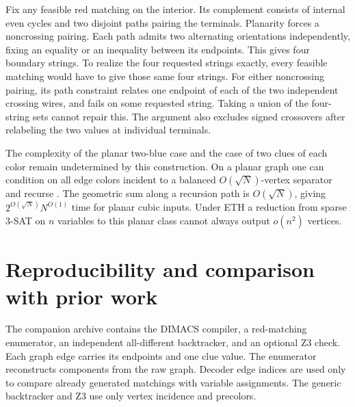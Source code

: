 \documentclass[12pt,letterpaper]{article}
\newcommand{\sh}[1]{\par\smallskip{\bfseries\color{ink}#1}\quad}
\newcommand{\Sec}[1]{\section{\color{ink}#1}}
\begin{document}
Fix any feasible red matching on the interior. Its complement consists of internal even cycles and two disjoint paths pairing the terminals. Planarity forces a noncrossing pairing. Each path admits two alternating orientations independently, fixing an equality or an inequality between its endpoints. This gives four boundary strings. To realize the four requested strings exactly, every feasible matching would have to give those same four strings. For either noncrossing pairing, its path constraint relates one endpoint of each of the two independent crossing wires, and fails on some requested string. Taking a union of the four-string sets cannot repair this. The argument also excludes signed crossovers after relabeling the two values at individual terminals.

The complexity of the planar two-blue case and the case of two clues of each color remain undetermined by this construction. On a planar graph one can condition on all edge colors incident to a balanced \(O(\sqrt{N})\)-vertex separator and recurse \cite{lt}. The geometric sum along a recursion path is \(O(\sqrt N)\), giving \(2^{O(\sqrt N)}N^{O(1)}\) time for planar cubic inputs. Under ETH a reduction from sparse 3-SAT on \(n\) variables to this planar class cannot always output \(o(n^2)\) vertices.

\newpage
\Sec{Reproducibility and comparison with prior work}
\begingroup\small
\sh{Raw graph tests.}
The companion archive contains the DIMACS compiler, a red-matching enumerator, an independent all-different backtracker, and an optional Z3 check. Each graph edge carries its endpoints and one clue value. The enumerator reconstructs components from the raw graph. Decoder edge indices are used only to compare already generated matchings with variable assignments. The generic backtracker and Z3 use only vertex incidence and precolors.
\end{document}
